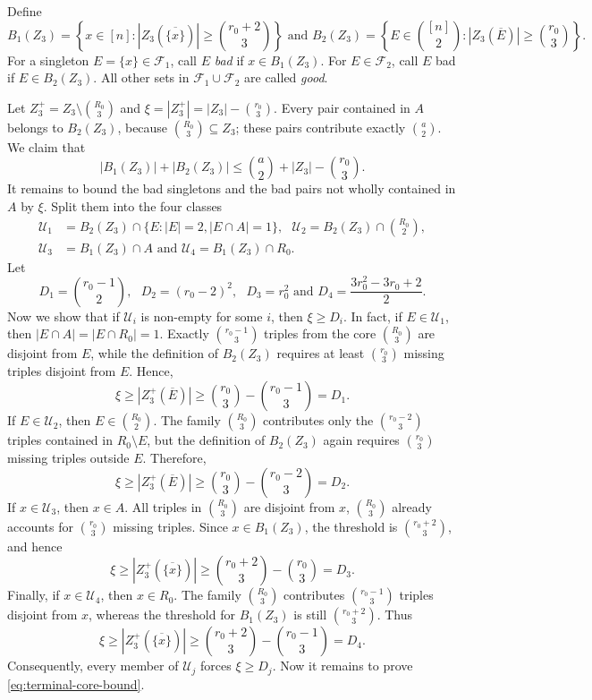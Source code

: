 \documentclass[10pt,a4paper]{article}
\numberwithin{equation}{section}
\theoremstyle{definition}
\newcommand{\F}{\mathcal F}
\begin{document}
Define
\[
        B_1(Z_3)=\left\{x\in[n]: |Z_3(\overline{\{x\}})|\ge\binom{r_0+2}{3}\right\} \text{ and }B_2(Z_3)=\left\{E\in\binom{[n]}2: |Z_3(\overline E)|\ge\binom{r_0}{3}\right\}.
\]
For a singleton $E=\{x\}\in\F_1$, call $E$ \emph{bad} if $x\in B_1(Z_3)$.
For $E\in\F_2$, call $E$ bad if $E\in B_2(Z_3)$.
All other sets in $\F_1\cup\F_2$ are called \emph{good}.


Let $Z_3^+=Z_3\setminus\binom{R_0}{3}$ and $\xi=|Z_3^+|=|Z_3|-\binom{r_0}{3}$.
Every pair contained in $A$ belongs to $B_2(Z_3)$, because $\binom{R_0}{3}\subseteq Z_3$; these pairs contribute exactly $\binom a2$.
We claim that
\begin{equation}\label{eq:terminal-core-bound}
        |B_1(Z_3)|+|B_2(Z_3)|\le\binom a2+|Z_3|-\binom{r_0}{3}.
\end{equation}
It remains to bound the bad singletons and the bad pairs not wholly contained in $A$ by $\xi$.
Split them into the four classes
\[
        \begin{aligned}
                \mathcal U_1 & =B_2(Z_3)\cap\{E:|E|=2,
                |E\cap A|=1\},\text{ }
                \mathcal U_2=B_2(Z_3)\cap\binom{R_0}{2}, \\
                \mathcal U_3 & =B_1(Z_3)\cap A
                \text{ and }
                \mathcal U_4=B_1(Z_3)\cap R_0.
        \end{aligned}
\]
Let
\[
        D_1=\binom{r_0-1}{2},\text{ }
        D_2=(r_0-2)^2,\text{ }
        D_3=r_0^2\text{ and }
        D_4=\frac{3r_0^2-3r_0+2}{2}.
\]
Now we show that if $\mathcal U_i$ is non-empty for some $i$, then $\xi\ge D_i$.
In fact, if $E\in\mathcal U_1$, then $|E\cap A|=|E\cap R_0|=1$.
Exactly $\binom{r_0-1}{3}$ triples from the core $\binom{R_0}{3}$ are disjoint from $E$, while the definition of $B_2(Z_3)$ requires at least $\binom{r_0}{3}$ missing triples disjoint from $E$.
Hence,
\[
        \xi
        \ge |Z_3^+(\overline E)|
        \ge \binom{r_0}{3}-\binom{r_0-1}{3}
        =D_1.
\]
If $E\in\mathcal U_2$, then $E\in\binom{R_0}{2}$.
The family $\binom{R_0}{3}$ contributes only the $\binom{r_0-2}{3}$ triples contained in $R_0\setminus E$, but the definition of $B_2(Z_3)$ again requires $\binom{r_0}{3}$ missing triples outside $E$.
Therefore,
\[
        \xi
        \ge |Z_3^+(\overline E)|
        \ge \binom{r_0}{3}-\binom{r_0-2}{3}
        =D_2.
\]
If $x\in\mathcal U_3$, then $x\in A$.
All triples in $\binom{R_0}{3}$ are disjoint from $x$, $\binom{R_0}{3}$ already accounts for $\binom{r_0}{3}$ missing triples.
Since $x\in B_1(Z_3)$, the threshold is $\binom{r_0+2}{3}$, and hence
\[
        \xi
        \ge |Z_3^+(\overline{\{x\}})|
        \ge \binom{r_0+2}{3}-\binom{r_0}{3}
        =D_3.
\]
Finally, if $x\in\mathcal U_4$, then $x\in R_0$.
The family $\binom{R_0}{3}$ contributes $\binom{r_0-1}{3}$  triples disjoint from $x$, whereas the threshold for $B_1(Z_3)$ is still $\binom{r_0+2}{3}$.
Thus
\[
        \xi
        \ge |Z_3^+(\overline{\{x\}})|
        \ge \binom{r_0+2}{3}-\binom{r_0-1}{3}
        =D_4.
\]
Consequently, every member of $\mathcal U_j$ forces $\xi\ge D_j$.
Now it remains to prove \eqref{eq:terminal-core-bound}.
\end{document}
